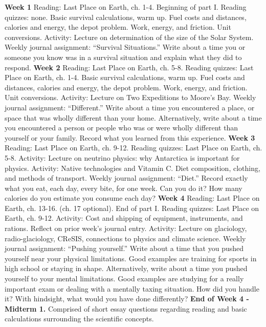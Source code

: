 \documentclass[10pt]{article}
\begin{document}
\begin{outline}[enumerate]
\1 \textbf{Week 1}
\2 Reading: Last Place on Earth, ch. 1-4. Beginning of part I.
\2 Reading quizzes: none.
\2 Basic survival calculations, warm up.  Fuel costs and distances, calories and energy, the depot problem.  Work, energy, and friction.  Unit conversions.
\2 Activity: Lecture on determination of the size of the Solar System.
\2 Weekly journal assignment: ``Survival Situations.'' Write about a time you or someone you know was in a survival situation and explain what they did to respond.
\1\textbf{Week 2}
\2 Reading: Last Place on Earth, ch. 5-8.
\2 Reading quizzes: Last Place on Earth, ch. 1-4.
\2 Basic survival calculations, warm up.  Fuel costs and distances, calories and energy, the depot problem.  Work, energy, and friction.  Unit conversions.
\2 Activity: Lecture on Two Expeditions to Moore's Bay.
\2 Weekly journal assignment: ``Different.''  Write about a time you encountered a place, or space that was wholly different than your home.  Alternatively, write about a time you encountered a person or people who was or were wholly different than yourself or your family.  Record what you learned from this experience.
\1 \textbf{Week 3}
\2 Reading: Last Place on Earth, ch. 9-12.
\2 Reading quizzes: Last Place on Earth, ch. 5-8.
\2 Activity: Lecture on neutrino physics: why Antarctica is important for physics.
\2 Activity: Native technologies and Vitamin C.  Diet composition, clothing, and methods of transport.
\2 Weekly journal assignment: ``Diet.''  Record exactly what you eat, each day, every bite, for one week.  Can you do it?  How many calories do you estimate you consume each day?
\1 \textbf{Week 4}
\2 Reading: Last Place on Earth, ch. 13-16. (ch. 17 optional). End of part I.
\2 Reading quizzes: Last Place on Earth, ch. 9-12.
\2 Activity: Cost and shipping of equipment, instruments, and rations.  Reflect on prior week's journal entry.
\2 Activity: Lecture on glaciology, radio-glaciology, CReSIS, connections to physics and climate science.
\2 Weekly journal assignment: ``Pushing yourself.''  Write about a time that you pushed yourself near your physical limitations.  Good examples are training for sports in high school or staying in shape.  Alternatively, write about a time you pushed yourself to your mental limitations.  Good examples are studying for a really important exam or dealing with a mentally taxing situation.  How did you handle it?  With hindsight, what would you have done differently?
\1 \textbf{End of Week 4 - Midterm 1.} Comprised of short essay questions regarding reading and basic calculations surrounding the scientific concepts.

\end{outline}
\end{document}
